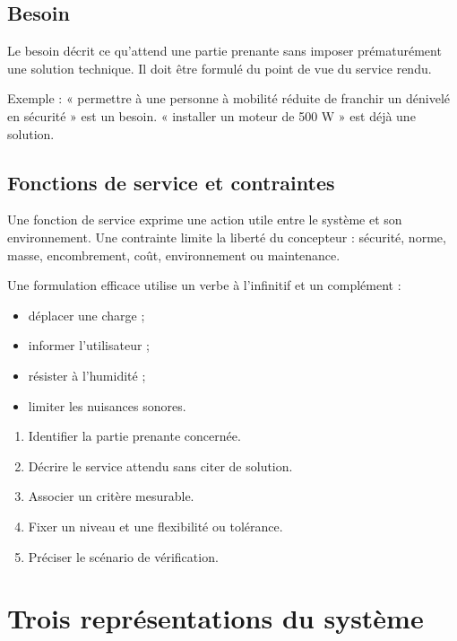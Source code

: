 \subsection{Besoin}

Le besoin décrit ce qu'attend une partie prenante sans imposer prématurément une solution technique. Il doit être formulé du point de vue du service rendu.

Exemple : « permettre à une personne à mobilité réduite de franchir un dénivelé en sécurité » est un besoin. « installer un moteur de 500 W » est déjà une solution.

\subsection{Fonctions de service et contraintes}

Une fonction de service exprime une action utile entre le système et son environnement. Une contrainte limite la liberté du concepteur : sécurité, norme, masse, encombrement, coût, environnement ou maintenance.

Une formulation efficace utilise un verbe à l'infinitif et un complément :
\begin{itemize}
  \item déplacer une charge ;
  \item informer l'utilisateur ;
  \item résister à l'humidité ;
  \item limiter les nuisances sonores.
\end{itemize}

\begin{ISmethode}[title={Formuler une exigence fonctionnelle}]
\begin{enumerate}
  \item Identifier la partie prenante concernée.
  \item Décrire le service attendu sans citer de solution.
  \item Associer un critère mesurable.
  \item Fixer un niveau et une flexibilité ou tolérance.
  \item Préciser le scénario de vérification.
\end{enumerate}
\end{ISmethode}

\section{Trois représentations du système}\label{sec:is-ecarts}

